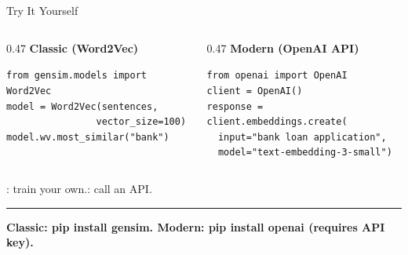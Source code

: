 \documentclass[8pt,aspectratio=169]{beamer}
\newcommand{\bottomnote}[1]{%
\vfill
\vspace{-2mm}
\textcolor{mllavender2}{\rule{\textwidth}{0.4pt}}
\vspace{1mm}
\footnotesize
\textbf{#1}
}
\begin{document}
\begin{frame}[fragile]{Try It Yourself}
\begin{columns}[t]
\begin{column}{0.47\textwidth}
\textcolor{mlpurple}{\textbf{Classic (Word2Vec)}}
\vspace{2mm}

{\small
\texttt{from gensim.models import Word2Vec}\\[1pt]
\texttt{model = Word2Vec(sentences,}\\[1pt]
\texttt{~~~~~~~~~~~~~~~~vector\_size=100)}\\[1pt]
\texttt{model.wv.most\_similar("bank")}
}
\end{column}
\begin{column}{0.47\textwidth}
\textcolor{mlblue}{\textbf{Modern (OpenAI API)}}
\vspace{2mm}

{\small
\texttt{from openai import OpenAI}\\[1pt]
\texttt{client = OpenAI()}\\[1pt]
\texttt{response = client.embeddings.create(}\\[1pt]
\texttt{~~input="bank loan application",}\\[1pt]
\texttt{~~model="text-embedding-3-small")}
}
\end{column}
\end{columns}

\vspace{5mm}
: train your own.: call an API.
\bottomnote{Classic: pip install gensim. Modern: pip install openai (requires API key).}
\end{frame}

\end{document}
